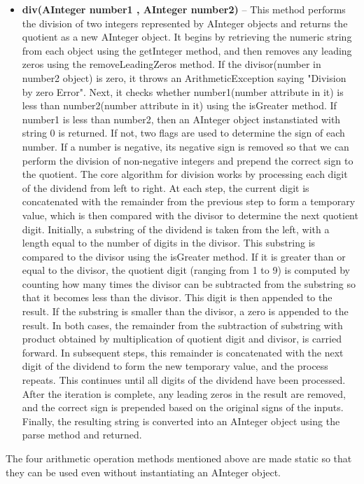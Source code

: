 \documentclass[a4paper,12pt]{article}
\begin{document}
{\begin{itemize}
    \item \textbf{div(AInteger number1 , AInteger number2)} -- This method performs the division of two integers represented by AInteger objects and returns the quotient as a new AInteger object. It begins by retrieving the numeric string from each object using the getInteger method, and then removes any leading zeros using the removeLeadingZeros method. If the divisor(number in number2 object) is zero, it throws an ArithmeticException saying "Division by zero Error". Next, it checks whether number1(number attribute in it) is less than number2(number attribute in it) using the isGreater method. If number1 is less than number2, then an AInteger object instanstiated with string $0$ is returned. If not, two flags are used to determine the sign of each number. If a number is negative, its negative sign is removed so that we can perform the division of non-negative integers and prepend the correct sign to the quotient. The core algorithm for division works by processing each digit of the dividend from left to right. At each step, the current digit is concatenated with the remainder from the previous step to form a temporary value, which is then compared with the divisor to determine the next quotient digit. Initially, a substring of the dividend is taken from the left, with a length equal to the number of digits in the divisor. This substring is compared to the divisor using the isGreater method. If it is greater than or equal to the divisor, the quotient digit (ranging from 1 to 9) is computed by counting how many times the divisor can be subtracted from the substring so that it becomes less than the divisor. This digit is then appended to the result. If the substring is smaller than the divisor, a zero is appended to the result. In both cases, the remainder from the subtraction of substring with product obtained by multiplication of quotient digit and divisor, is carried forward. In subsequent steps, this remainder is concatenated with the next digit of the dividend to form the new temporary value, and the process repeats. This continues until all digits of the dividend have been processed. After the iteration is complete, any leading zeros in the result are removed, and the correct sign is prepended based on the original signs of the inputs. Finally, the resulting string is converted into an AInteger object using the parse method and returned.\\
\end{itemize}
The four arithmetic operation methods mentioned above are made static so that they can be used even without instantiating an AInteger object.

}
\end{document}

